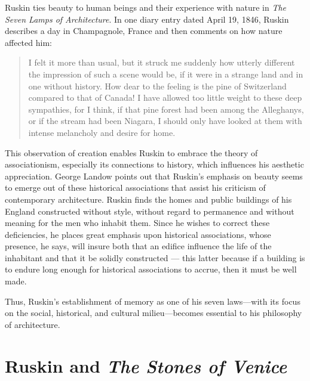 Ruskin ties beauty to human beings and their experience with nature in
\textit{The Seven Lamps of Architecture}.  In one diary entry dated
April 19, 1846, Ruskin describes a day in Champagnole, France and then
comments on how nature affected him: 

\begin{quote}
I felt it more than usual, but it struck me suddenly how utterly
different the impression of such a scene would be, if it were in a
strange land and in one without history.  How dear to the feeling is
the pine of Switzerland compared to that of Canada!  I have allowed too
little weight to these deep sympathies, for I think, if that pine
forest had been among the Alleghanys, or if the stream had been
Niagara, I should only have looked at them with intense melancholy and
desire for home. \citep[][pp.~325]{ruskin1956}
\end{quote}

This observation of creation enables Ruskin to embrace the theory of
associationism, especially its connections to history, which influences
his aesthetic appreciation.  George Landow points out that Ruskin’s
emphasis on beauty seems to emerge out of these historical associations
that assist his criticism of contemporary architecture.  Ruskin finds the homes and
public buildings of his England constructed without style, without
regard to permanence and without meaning for the men who inhabit them. 
Since he wishes to correct these deficiencies, he places great emphasis
upon historical associations, whose presence, he says, will insure both
that an edifice influence the life of the inhabitant and that it be
solidly constructed — this latter because if a building is to endure
long enough for historical associations to accrue, then it must be well
made. 

Thus, Ruskin’s establishment of memory as one of his seven laws—with its
focus on the social, historical, and cultural milieu—becomes essential
to his philosophy of architecture. 

\section{Ruskin and \textit{The Stones of Venice}}


